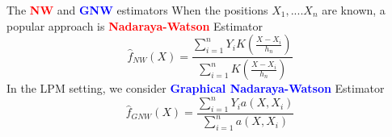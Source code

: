 \documentclass[final,dvipsnames]{beamer}
\newcommand{\myemphh}[1]{\textbf{\textcolor{blue}{#1}}}
\newcommand{\myemphr}[1]{\textbf{\textcolor{red}{#1}}}
\begin{document}
\begin{frame}
\begin{columns}[T]

\begin{column}{0.48\textwidth}
\begin{block}{The \myemphr{NW} and \myemphh{GNW} estimators}
\small When the positions $X_1,....X_n$ are known, a popular approach is \myemphr{Nadaraya-Watson} Estimator
\begin{equation*}
    \hat{f}_{NW}(X)=\frac{\sum_{i=1}^n Y_iK(\frac{X-X_i}{h_n})}{\sum_{i=1}^n K(\frac{X-X_i}{h_n})}
    \end{equation*}
\small In the LPM setting, we consider 
\myemphh{Graphical Nadaraya-Watson} Estimator
    \begin{equation*}
        \hat{f}_{GNW}(X)=\frac{\sum_{i=1}^n Y_i a(X,X_i)}{\sum_{i=1}^n a(X,X_i)}
    \end{equation*}


\end{block}
\end{column}
\end{columns}
\end{frame}
\end{document}
